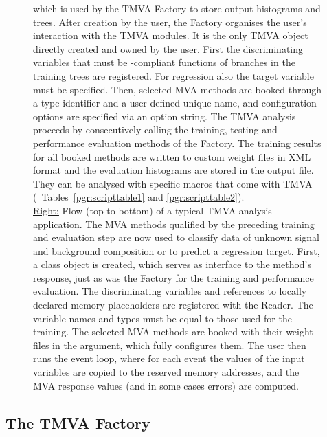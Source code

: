 \begin{figure}[p]
{         which is used by the TMVA Factory to store output histograms 
         and trees. After creation by the user, the Factory organises the 
         user's interaction with the TMVA modules. It is the only TMVA object 
         directly created and owned by the user. First the discriminating
         variables that must be -compliant functions of 
         branches in the training trees are registered. For regression also
         the target variable must be specified. Then, selected MVA methods
         are booked through a type identifier and a user-defined unique name,
         and configuration options are specified via an option string. 
         The TMVA analysis proceeds by consecutively calling the training, 
         testing and performance evaluation methods of the Factory. The training 
         results for all booked methods are written to custom weight files in 
         XML format and the evaluation histograms are stored in the output file. 
         They can be analysed with specific macros that come with TMVA (\cf\  
         Tables~\ref{pgr:scripttable1} and \ref{pgr:scripttable2}). \\
         \underline{Right:} Flow (top to bottom) of a typical 
         TMVA analysis application. The MVA methods qualified by the preceding 
         training and evaluation step are now used to classify data of unknown 
         signal and background composition or to predict a regression target. 
         First, a \code{Reader} class object is created, which 
         serves as interface to the method's response, just as was the Factory 
         for the training and performance evaluation. The discriminating variables 
         and references to locally declared memory placeholders are registered
         with the Reader. The variable names and types must be equal to those
         used for the training. The selected MVA methods are booked with their 
         weight files in the argument, which fully configures them. The user 
         then runs the event loop, where for each event the values of the input
         variables are copied to the reserved memory addresses, and the MVA
         response values (and in some cases errors) are computed.
         \index{Factory}\index{Reader}\index{TMVA analysis flow}
}
\label{fig:TMVAflow}
\end{figure}

\subsection{The TMVA Factory}
\label{sec:usingtmva:factory}

